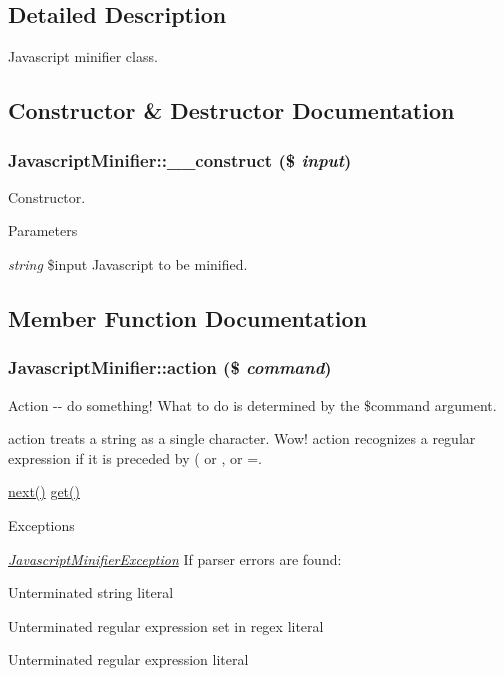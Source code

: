 \subsection{Detailed Description}
Javascript minifier class. 

\subsection{Constructor \& Destructor Documentation}
\hypertarget{classJavascriptMinifier_a3758aa5599a06cb1365171b4ef7cb818}{
\subsubsection[{\_\-\_\-construct}]{\setlength{\rightskip}{0pt plus 5cm}JavascriptMinifier::\_\-\_\-construct (\$ {\em input})}}
\label{classJavascriptMinifier_a3758aa5599a06cb1365171b4ef7cb818}
Constructor.


\begin{DoxyParams}{Parameters}
\item[{\em string}]\$input Javascript to be minified. \end{DoxyParams}


\subsection{Member Function Documentation}
\hypertarget{classJavascriptMinifier_a0c75407b85df75294ca362f65285df79}{
\subsubsection[{action}]{\setlength{\rightskip}{0pt plus 5cm}JavascriptMinifier::action (\$ {\em command})}}
\label{classJavascriptMinifier_a0c75407b85df75294ca362f65285df79}
Action -\/-\/ do something! What to do is determined by the \$command argument.

action treats a string as a single character. Wow! action recognizes a regular expression if it is preceded by ( or , or =.

\hyperlink{classJavascriptMinifier_af6ec11eefc8cd9f0e456fa9d37a8c59d}{next()}  \hyperlink{classJavascriptMinifier_ae7e2ae85b89dcd36f10c8298cc5c8749}{get()} 
\begin{DoxyExceptions}{Exceptions}
\item[{\em \hyperlink{classJavascriptMinifierException}{JavascriptMinifierException}}]If parser errors are found:
\begin{DoxyItemize}
\item Unterminated string literal
\item Unterminated regular expression set in regex literal
\item Unterminated regular expression literal 
\end{DoxyItemize}\end{DoxyExceptions}

